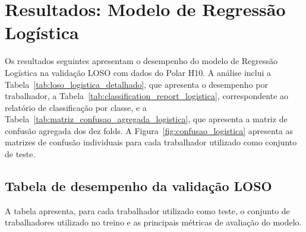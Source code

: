 \section{Resultados: Modelo de Regressão Logística}

Os resultados seguintes apresentam o desempenho do modelo de Regressão Logística na validação LOSO com dados do Polar H10. A análise inclui a Tabela~\ref{tab:loso_logistica_detalhado}, que apresenta o desempenho por trabalhador, a Tabela~\ref{tab:classification_report_logistica}, correspondente ao relatório de classificação por classe, e a Tabela~\ref{tab:matriz_confusao_agregada_logistica}, que apresenta a matriz de confusão agregada dos dez folds. A Figura~\ref{fig:confusao_logistica} apresenta as matrizes de confusão individuais para cada trabalhador utilizado como conjunto de teste.

\subsection{Tabela de desempenho da validação LOSO}

A tabela apresenta, para cada trabalhador utilizado como teste, o conjunto de trabalhadores utilizado no treino e as principais métricas de avaliação do modelo.

